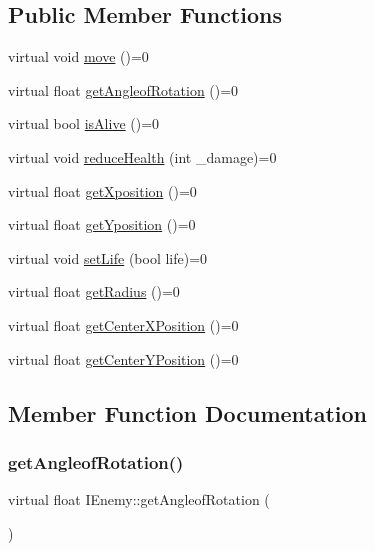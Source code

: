 \subsection*{Public Member Functions}
\begin{DoxyCompactItemize}
\item 
virtual void \hyperlink{class_i_enemy_a0dbed8e8e15436305b6ede08b618c232}{move} ()=0
\item 
virtual float \hyperlink{class_i_enemy_a8a9780d5db69d910f264fd7ab89ebee6}{get\+Angleof\+Rotation} ()=0
\item 
virtual bool \hyperlink{class_i_enemy_a3e44ca5e5fabcfd71b26657eba26e5a2}{is\+Alive} ()=0
\item 
virtual void \hyperlink{class_i_enemy_acbc451cafee99cb405d9d9248820b6ea}{reduce\+Health} (int \+\_\+damage)=0
\item 
virtual float \hyperlink{class_i_enemy_a504ea7fa77b8984d5b9dd71352876943}{get\+Xposition} ()=0
\item 
virtual float \hyperlink{class_i_enemy_a8011be7f510f6630250f8b9529815773}{get\+Yposition} ()=0
\item 
virtual void \hyperlink{class_i_enemy_ab58f2f6c2a8c08730aaf8771f088e1bf}{set\+Life} (bool life)=0
\item 
virtual float \hyperlink{class_i_enemy_ab1fb8f6320916ef6a1497f9651704d05}{get\+Radius} ()=0
\item 
virtual float \hyperlink{class_i_enemy_ab5bc39484a8aeaf278c3d127ec5d9545}{get\+Center\+X\+Position} ()=0
\item 
virtual float \hyperlink{class_i_enemy_ac9a2d69103fa86d8344aa368fb33c714}{get\+Center\+Y\+Position} ()=0
\end{DoxyCompactItemize}


\subsection{Member Function Documentation}
\mbox{\label{class_i_enemy_a8a9780d5db69d910f264fd7ab89ebee6}} 
\subsubsection{\texorpdfstring{get\+Angleof\+Rotation()}{getAngleofRotation()}}
{\footnotesize\ttfamily virtual float I\+Enemy\+::get\+Angleof\+Rotation (\begin{DoxyParamCaption}{ }\end{DoxyParamCaption})\hspace{0.3cm}{\ttfamily [pure virtual]}}



